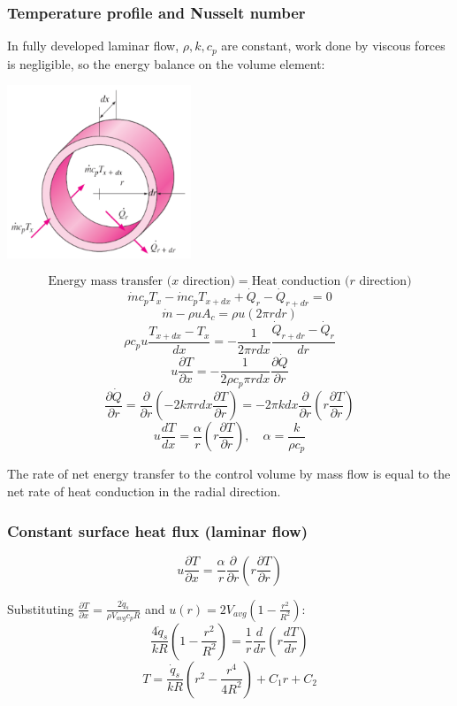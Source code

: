 \documentclass[11pt]{article}
\begin{document}
\subsubsection{Temperature profile and Nusselt number}
\label{sec:org0c8ae71}
In fully developed laminar flow, \(\rho, k, c_p\) are constant, work done by viscous forces is negligible, so the energy balance on the volume element:
\begin{center}
\includegraphics[height=14em]{./images/temperature-profile-and-nusselt-number-diagram.png}
\end{center}
\[\text{Energy mass transfer ($x$ direction)} = \text{Heat conduction ($r$ direction)}\]
\[\dot{m} c_p T_x - \dot{m} c_p T_{x + dx} + \dot{Q}_r - \dot{Q}_{r + dr} = 0\]
\[\dot{m} - \rho u A_c = \rho u (2 \pi r dr)\]
\[\rho c_p u \frac{T_{x + dx} - T_x}{dx} = - \frac{1}{2 \pi r dx} \frac{\dot{Q}_{r + dr} - \dot{Q}_r}{dr}\]
\[u \frac{\partial T}{\partial x} = - \frac{1}{2 \rho c_p \pi r dx} \frac{\partial \dot{Q}}{\partial r}\]
\[\frac{\partial \dot{Q}}{\partial r} = \frac{\partial}{\partial r} \left(-2k \pi r dx \frac{\partial T}{\partial r} \right) = - 2 \pi k dx \frac{\partial}{\partial r} \left(r \frac{\partial T}{\partial r} \right)\]
\[u \frac{dT}{dx} = \frac{\alpha}{r} \left(r \frac{\partial T}{\partial r} \right), \quad \alpha = \frac{k}{\rho c_p}\]

The rate of net energy transfer to the control volume by mass flow is equal to the net rate of heat conduction in the radial direction.
\subsubsection{Constant surface heat flux (laminar flow)}
\label{sec:orga63a2df}
\[u \frac{\partial T}{\partial x} = \frac{\alpha}{r} \frac{\partial}{\partial r} \left(r \frac{\partial T}{\partial r} \right)\]

Substituting \(\frac{\partial T}{\partial x} = \frac{2 \dot{q}_s}{\rho V_{avg} c_p R}\) and \(u(r) = 2 V_{avg} \left(1 - \frac{r^2}{R^2} \right)\):
\[\frac{4 \dot{q}_s}{kR} \left(1 - \frac{r^2}{R^2} \right) = \frac{1}{r} \frac{d}{dr} \left(r \frac{dT}{dr} \right)\]
\[T = \frac{\dot{q}_s}{kR} \left(r^2 - \frac{r^4}{4R^2} \right) + C_1 r + C_2\]
\end{document}

